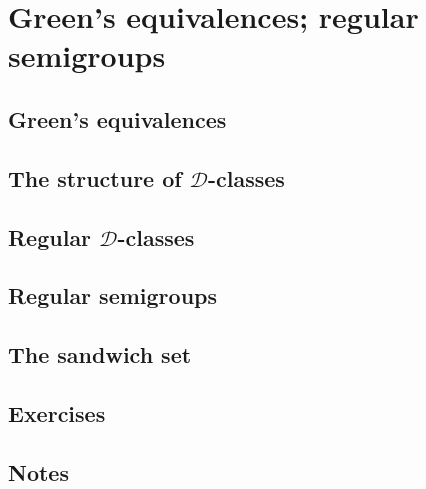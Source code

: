 \section[2]{Green's equivalences; regular semigroups}

\subsection[1]{Green's equivalences}
\subsection[2]{The structure of $\mathcal{D}$-classes}
\subsection[3]{Regular $\mathcal{D}$-classes}
\subsection[4]{Regular semigroups}
\subsection[5]{The sandwich set}
\subsection[6]{Exercises}
\subsection[7]{Notes}